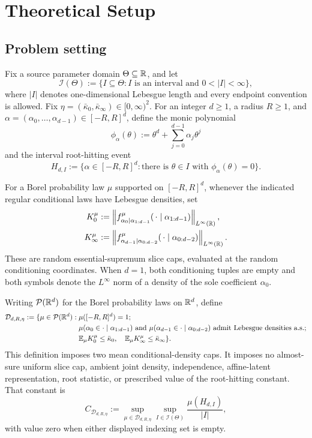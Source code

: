 \section{Theoretical Setup}

\subsection{Problem setting}

Fix a source parameter domain $\Theta\subseteq\mathbb{R}$, and let
\[
\mathcal I(\Theta)
:=\{I\subseteq\Theta:I\text{ is an interval and }0<|I|<\infty\},
\]
where $|I|$ denotes one-dimensional Lebesgue length and every endpoint
convention is allowed.  Fix
$\eta=(\bar\kappa_0,\bar\kappa_\infty)\in[0,\infty)^2$.  For an integer
$d\geq1$, a radius $R\geq1$, and
$\alpha=(\alpha_0,\ldots,\alpha_{d-1})\in[-R,R]^d$, define the monic
polynomial
\[
\phi_\alpha(\theta)
:=\theta^d+\sum_{j=0}^{d-1}\alpha_j\theta^j
\]
and the interval root-hitting event
\[
H_{d,I}:=\{\alpha\in[-R,R]^d:\text{there is }\theta\in I
\text{ with }\phi_\alpha(\theta)=0\}.
\]

For a Borel probability law $\mu$ supported on $[-R,R]^d$, whenever the
indicated regular conditional laws have Lebesgue densities, set
\[
\begin{aligned}
K_0^\mu
&:=\left\|f^\mu_{\alpha_0\mid\alpha_{1:d-1}}
  (\,\cdot\mid\alpha_{1:d-1})\right\|_{L^\infty(\mathbb{R})},\\
K_\infty^\mu
&:=\left\|f^\mu_{\alpha_{d-1}\mid\alpha_{0:d-2}}
  (\,\cdot\mid\alpha_{0:d-2})\right\|_{L^\infty(\mathbb{R})}.
\end{aligned}
\]
These are random essential-supremum slice caps, evaluated at the random
conditioning coordinates.  When $d=1$, both conditioning tuples are empty
and both symbols denote the $L^\infty$ norm of a density of the sole
coefficient $\alpha_0$.

Writing $\mathcal P(\mathbb{R}^d)$ for the Borel probability laws on $\mathbb{R}^d$, define
\[
\begin{aligned}
\mathcal D_{d,R,\eta}:=\{\mu\in\mathcal P(\mathbb{R}^d):\;&
\mu([-R,R]^d)=1;\\
&\mu(\alpha_0\in\cdot\mid\alpha_{1:d-1})\text{ and }
\mu(\alpha_{d-1}\in\cdot\mid\alpha_{0:d-2})
\text{ admit Lebesgue densities a.s.};\\
&\mathbb E_\mu K_0^\mu\leq\bar\kappa_0,
\quad \mathbb E_\mu K_\infty^\mu\leq\bar\kappa_\infty\}.
\end{aligned}
\]
This definition imposes two mean conditional-density caps.  It imposes no
almost-sure uniform slice cap, ambient joint density, independence,
affine-latent representation, root statistic, or prescribed value of the
root-hitting constant.  That constant is
\[
C_{\mathcal D_{d,R,\eta}}
:=\sup_{\mu\in\mathcal D_{d,R,\eta}}
  \sup_{I\in\mathcal I(\Theta)}
  \frac{\mu(H_{d,I})}{|I|},
\]
with value zero when either displayed indexing set is empty.

